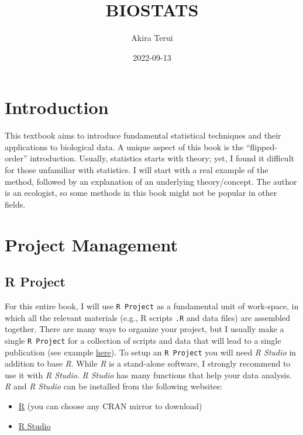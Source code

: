 \documentclass[
]{book}
\title{BIOSTATS}
\author{Akira Terui}
\date{2022-09-13}
\providecommand{\tightlist}{%
  \setlength{\itemsep}{0pt}\setlength{\parskip}{0pt}}
\begin{document}
\maketitle

{
\setcounter{tocdepth}{1}
\tableofcontents
}
\hypertarget{introduction}{%
\chapter{Introduction}\label{introduction}}

This textbook aims to introduce fundamental statistical techniques and their applications to biological data. A unique aspect of this book is the ``flipped-order'' introduction. Usually, statistics starts with theory; yet, I found it difficult for those unfamiliar with statistics. I will start with a real example of the method, followed by an explanation of an underlying theory/concept. The author is an ecologist, so some methods in this book might not be popular in other fields.

\hypertarget{project-management}{%
\chapter{Project Management}\label{project-management}}

\hypertarget{r-project}{%
\section{R Project}\label{r-project}}

For this entire book, I will use \texttt{R\ Project} as a fundamental unit of work-space, in which all the relevant materials (e.g., R scripts \texttt{.R} and data files) are assembled together. There are many ways to organize your project, but I usually make a single \texttt{R\ Project} for a collection of scripts and data that will lead to a single publication (see example \href{https://github.com/aterui/public-proj_stream-diversity}{here}). To setup an \texttt{R\ Project} you will need \emph{R Studio} in addition to base \emph{R}. While \emph{R} is a stand-alone software, I strongly recommend to use it with \emph{R Studio}. \emph{R Studio} has many functions that help your data analysis. \emph{R} and \emph{R Studio} can be installed from the following websites:

\begin{itemize}
\tightlist
\item
  \href{https://www.r-project.org/}{R} (you can choose any CRAN mirror to download)
\item
  \href{https://rStudio.com/products/rStudio/download/}{R Studio}
\end{itemize}
\end{document}
